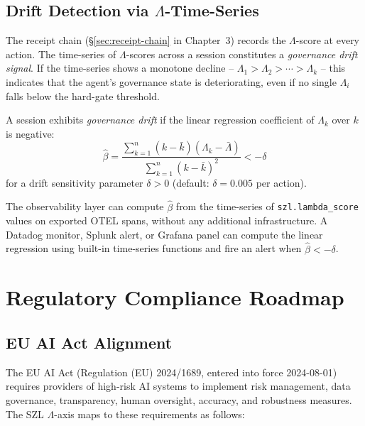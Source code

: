 \subsection{Drift Detection via $\Lambda$-Time-Series}
\label{ssec:drift-detection}

The receipt chain (\S\ref{sec:receipt-chain} in Chapter~3) records the
$\Lambda$-score at every action.  The time-series of $\Lambda$-scores across
a session constitutes a \emph{governance drift signal}.  If the time-series
shows a monotone decline -- $\Lambda_1 > \Lambda_2 > \cdots > \Lambda_k$ --
this indicates that the agent's governance state is deteriorating, even if
no single $\Lambda_i$ falls below the hard-gate threshold.

\begin{definition}
  \label{def:governance-drift}
  A session exhibits \emph{governance drift} if the linear regression
  coefficient of $\Lambda_k$ over $k$ is negative:
  \[
    \hat{\beta} = \frac{\sum_{k=1}^{n}(k - \bar{k})(\Lambda_k - \bar{\Lambda})}
                       {\sum_{k=1}^{n}(k - \bar{k})^2} < -\delta
  \]
  for a drift sensitivity parameter $\delta > 0$ (default: $\delta = 0.005$
  per action).
\end{definition}

The observability layer can compute $\hat{\beta}$ from the time-series of
\texttt{szl.lambda\_score} values on exported OTEL spans, without any
additional infrastructure.  A Datadog monitor, Splunk alert, or Grafana
panel can compute the linear regression using built-in time-series functions
and fire an alert when $\hat{\beta} < -\delta$.

\section{Regulatory Compliance Roadmap}
\label{sec:regulatory-roadmap}

\subsection{EU AI Act Alignment}
\label{ssec:eu-ai-act}

The EU AI Act (Regulation (EU) 2024/1689, entered into force 2024-08-01)
requires providers of high-risk AI systems to implement risk management,
data governance, transparency, human oversight, accuracy, and robustness
measures.  The SZL $\Lambda$-axis maps to these requirements as follows:

